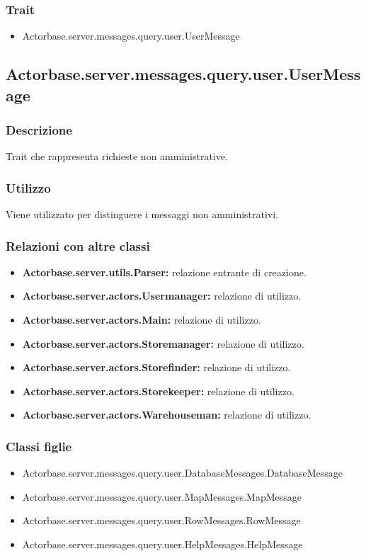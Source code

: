 \documentclass[a4paper]{article}
\begin{document}
			\subsubsection{Trait}
				\begin{itemize}
					\item Actorbase.server.messages.query.user.UserMessage
				\end{itemize}
				
		\subsection{Actorbase.server.messages.query.user.UserMessage}
			\subsubsection{Descrizione}
				Trait che rappresenta richieste non amministrative.
				
			\subsubsection{Utilizzo}
				Viene utilizzato per distinguere i messaggi non amministrativi. 
				
			\subsubsection{Relazioni con altre classi}
				\begin{itemize}
					\item \textbf{Actorbase.server.utils.Parser:} relazione entrante di creazione.
					\item \textbf{Actorbase.server.actors.Usermanager:} relazione di utilizzo.
					\item \textbf{Actorbase.server.actors.Main:} relazione di utilizzo.
					\item \textbf{Actorbase.server.actors.Storemanager:} relazione di utilizzo.
					\item \textbf{Actorbase.server.actors.Storefinder:} relazione di utilizzo.
					\item \textbf{Actorbase.server.actors.Storekeeper:} relazione di utilizzo.
					\item \textbf{Actorbase.server.actors.Warehouseman:} relazione di utilizzo.
				\end{itemize}
			\subsubsection{Classi figlie}
				\begin{itemize}
					\item Actorbase.server.messages.query.user.DatabaseMessages.DatabaseMessage
					\item Actorbase.server.messages.query.user.MapMessages.MapMessage
					\item Actorbase.server.messages.query.user.RowMessages.RowMessage
					\item Actorbase.server.messages.query.user.HelpMessages.HelpMessage
				\end{itemize}
		
\end{document}
